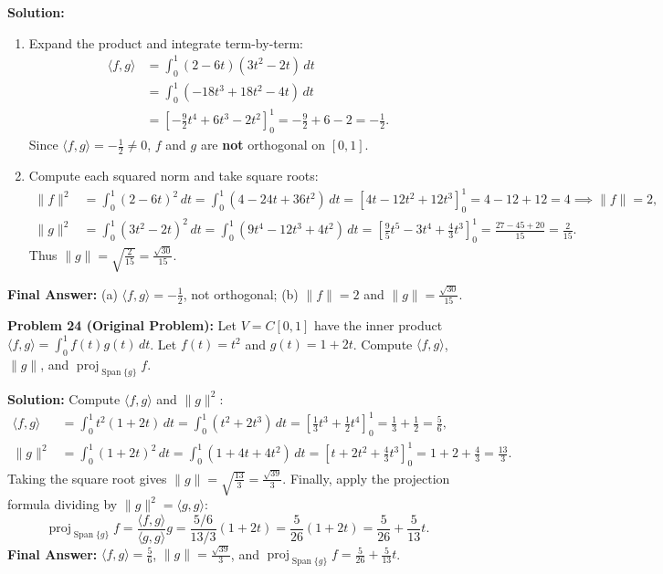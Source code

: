 \documentclass[11pt, letterpaper]{article}
\theoremstyle{definition}
\theoremstyle{remark}
\begin{document}
\textbf{Solution:}
\begin{enumerate}[label=(\alph*)]
    \item Expand the product and integrate term-by-term:
    \begin{align*}
    \langle f, g \rangle &= \int_0^1 (2 - 6t)(3t^2 - 2t)\,dt \\
    &= \int_0^1 (-18t^3 + 18t^2 - 4t)\,dt \\
    &= \left[-\frac{9}{2}t^4 + 6t^3 - 2t^2\right]_0^1 = -\frac{9}{2} + 6 - 2 = -\frac{1}{2}.
    \end{align*}
    Since $\langle f, g \rangle = -\frac{1}{2} \neq 0$, $f$ and $g$ are \textbf{not} orthogonal on $[0, 1]$.
    \item Compute each squared norm and take square roots:
    \begin{align*}
    \|f\|^2 &= \int_0^1 (2 - 6t)^2\,dt = \int_0^1 (4 - 24t + 36t^2)\,dt = \left[4t - 12t^2 + 12t^3\right]_0^1 = 4 - 12 + 12 = 4 \implies \|f\| = 2, \\
    \|g\|^2 &= \int_0^1 (3t^2 - 2t)^2\,dt = \int_0^1 (9t^4 - 12t^3 + 4t^2)\,dt = \left[\frac{9}{5}t^5 - 3t^4 + \frac{4}{3}t^3\right]_0^1 = \frac{27 - 45 + 20}{15} = \frac{2}{15}.
    \end{align*}
    Thus $\|g\| = \sqrt{\frac{2}{15}} = \frac{\sqrt{30}}{15}$.
\end{enumerate}
\textbf{Final Answer:} (a) $\langle f, g \rangle = -\frac{1}{2}$, not orthogonal; (b) $\|f\| = 2$ and $\|g\| = \frac{\sqrt{30}}{15}$.

\medskip

\textbf{Problem 24 (Original Problem):} Let $V = C[0, 1]$ have the inner product $\langle f, g \rangle = \int_0^1 f(t)g(t)\,dt$. Let $f(t) = t^2$ and $g(t) = 1 + 2t$. Compute $\langle f, g \rangle$, $\|g\|$, and $\operatorname{proj}_{\operatorname{Span}\{g\}} f$.

\textbf{Solution:} Compute $\langle f, g \rangle$ and $\|g\|^2$:
\begin{align*}
\langle f, g \rangle &= \int_0^1 t^2(1 + 2t)\,dt = \int_0^1 (t^2 + 2t^3)\,dt = \left[\frac{1}{3}t^3 + \frac{1}{2}t^4\right]_0^1 = \frac{1}{3} + \frac{1}{2} = \frac{5}{6}, \\
\|g\|^2 &= \int_0^1 (1 + 2t)^2\,dt = \int_0^1 (1 + 4t + 4t^2)\,dt = \left[t + 2t^2 + \frac{4}{3}t^3\right]_0^1 = 1 + 2 + \frac{4}{3} = \frac{13}{3}.
\end{align*}
Taking the square root gives $\|g\| = \sqrt{\frac{13}{3}} = \frac{\sqrt{39}}{3}$. Finally, apply the projection formula dividing by $\|g\|^2 = \langle g, g \rangle$:
\[
\operatorname{proj}_{\operatorname{Span}\{g\}} f = \frac{\langle f, g \rangle}{\langle g, g \rangle}g = \frac{5/6}{13/3}(1 + 2t) = \frac{5}{26}(1 + 2t) = \frac{5}{26} + \frac{5}{13}t.
\]
\textbf{Final Answer:} $\langle f, g \rangle = \frac{5}{6}$, $\|g\| = \frac{\sqrt{39}}{3}$, and $\operatorname{proj}_{\operatorname{Span}\{g\}} f = \frac{5}{26} + \frac{5}{13}t$.
\end{document}
